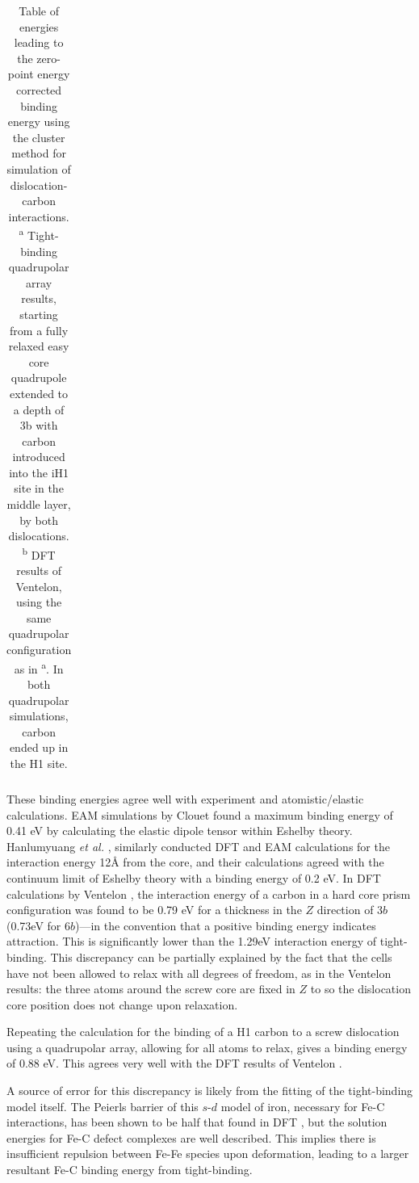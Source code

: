 \documentclass[a4paper,11pt]{article}
\begin{document}
\begin{table}
\begin{tabular}{cccccc}
    \end{tabular}		
    \caption{Table of energies leading to the zero-point energy corrected binding energy using the cluster method for simulation of dislocation-carbon interactions. \textsuperscript{a} Tight-binding quadrupolar array results, starting from a fully relaxed easy core quadrupole extended to a depth of 3b with carbon introduced into the iH1 site in the middle layer, by both dislocations. \textsuperscript{b} DFT results of Ventelon, using the same quadrupolar configuration as in \textsuperscript{a}. In both quadrupolar simulations, carbon ended up in the H1 site.}
    \label{tab:bindingenergies}
\end{table}

These binding energies agree well with experiment and atomistic/elastic calculations. EAM simulations
by Clouet \cite{Clouet2008,Becquart2007} found a maximum binding energy of 0.41 eV by calculating
the elastic dipole tensor within Eshelby theory. Hanlumyuang \emph{et al.} \cite{Hanlumyuang2010},
similarly conducted DFT and EAM calculations for the interaction energy 12\AA{} from the core, and
their calculations agreed with the continuum limit of Eshelby theory with a binding energy of
0.2 eV. In DFT calculations by Ventelon \cite{Ventelon2015}, the interaction energy of a carbon in a
hard core prism configuration was found to be 0.79 eV for a thickness in the \(Z\) direction of
3\(b\) (0.73eV for \(6b\))---in the convention that a positive binding energy indicates
attraction. This is significantly lower than the 1.29eV interaction energy of tight-binding.
This discrepancy can be partially explained by the fact that the cells have not been allowed to
relax with all degrees of freedom, as in the Ventelon results: the three atoms around the screw
core are fixed in \(Z\) to so the dislocation core position does not change upon
relaxation. 

Repeating the calculation for the binding of a H1 carbon to a screw
dislocation using a quadrupolar array, allowing for all atoms to relax, gives a
binding energy of 0.88 eV. This agrees very well with the DFT results of Ventelon
\cite{Ventelon2015}.

A source of error for this discrepancy is likely from the fitting of the tight-binding model
itself. The Peierls barrier of this \(s\text{-}d\) model of iron, necessary for Fe-C
interactions, has been shown to be half that found in DFT \cite{Simpson2019}, but the
solution energies for Fe-C defect complexes are well described. This implies there is
insufficient repulsion between Fe-Fe species upon deformation, leading to a larger
resultant Fe-C binding energy from tight-binding.
\end{document}
